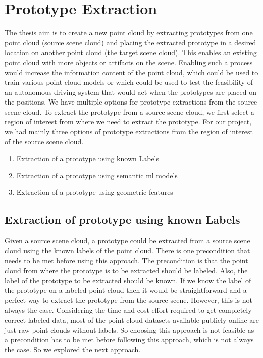\section{Prototype Extraction}
The thesis aim is to create a new point cloud by extracting prototypes from one point cloud (source scene cloud) and placing the extracted prototype in a desired location on another point cloud (the target scene cloud). This enables an existing point cloud with more objects or artifacts on the scene. Enabling such a process would increase the information content of the point cloud, which could be used to train various point cloud models or which could be used to test the feasibility of an autonomous driving system that would act when the prototypes are placed on the positions.
We have multiple options for prototype extractions from the source scene cloud. To extract the prototype from a source scene cloud, we first select a region of interest from where we need to extract the prototype. For our project, we had mainly three options of prototype extractions from the region of interest of the source scene cloud. 
\begin{enumerate}
    \item Extraction of a prototype using known Labels
    \item Extraction of a prototype using semantic \acrshort{ml} models
    \item Extraction of a prototype using geometric features
\end{enumerate}

\subsection{Extraction of prototype using known Labels}
Given a source scene cloud, a prototype could be extracted from a source scene cloud using the known labels of the point cloud. There is one precondition that needs to be met before using this approach. The precondition is that the point cloud from where the prototype is to be extracted should be labeled. Also, the label of the prototype to be extracted should be known. If we know the label of the prototype on a labeled point cloud then it would be straightforward and a perfect way to extract the prototype from the source scene. However, this is not always the case. Considering the time and cost effort required to get completely correct labeled data, most of the point cloud datasets available publicly online are just raw point clouds without labels. So choosing this approach is not feasible as a precondition has to be met before following this approach, which is not always the case. So we explored the next approach.

